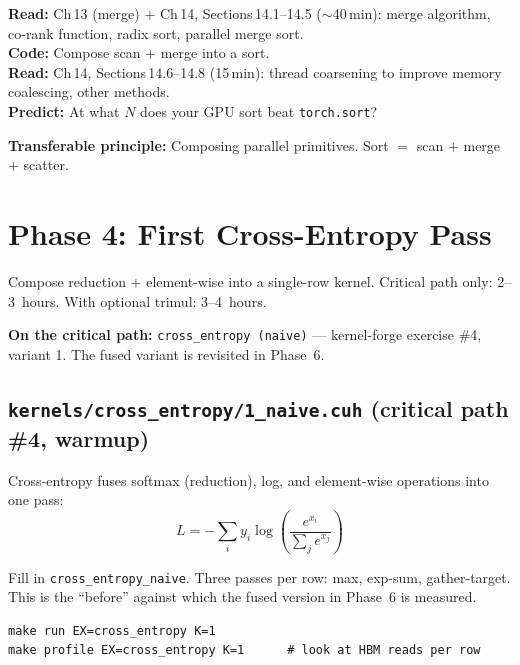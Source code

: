 \documentclass[11pt, letterpaper]{article}
\begin{document}
\textbf{Read:} Ch\,13 (merge) + Ch\,14, Sections\,14.1--14.5 ($\sim$40\,min): merge algorithm, co-rank function, radix sort, parallel merge sort.\\
\textbf{Code:} Compose scan + merge into a sort.\\
\textbf{Read:} Ch\,14, Sections\,14.6--14.8 (15\,min): thread coarsening to improve memory coalescing, other methods.\\
\textbf{Predict:} At what $N$ does your GPU sort beat \texttt{torch.sort}?

\begin{tastebox}
\textbf{Transferable principle:} Composing parallel primitives. Sort $=$ scan $+$ merge $+$ scatter.
\end{tastebox}

\section{Phase 4: First Cross-Entropy Pass}

\begin{phasebox}[Goal]
Compose reduction + element-wise into a single-row kernel. Critical path only: 2--3~hours. With optional trimul: 3--4~hours.
\end{phasebox}

\textbf{On the critical path:} \texttt{cross\_entropy (naive)} --- kernel-forge exercise \#4, variant 1. The fused variant is revisited in Phase~6.

\subsection{\texttt{kernels/cross\_entropy/1\_naive.cuh} (critical path \#4, warmup)}

Cross-entropy fuses softmax (reduction), log, and element-wise operations into one pass:
\[
  L = -\sum_i y_i \log\!\left(\frac{e^{x_i}}{\sum_j e^{x_j}}\right)
\]

Fill in \texttt{cross\_entropy\_naive}. Three passes per row: max, exp-sum, gather-target. This is the ``before'' against which the fused version in Phase~6 is measured.

\begin{verbatim}
make run EX=cross_entropy K=1
make profile EX=cross_entropy K=1      # look at HBM reads per row
\end{verbatim}
\end{document}
